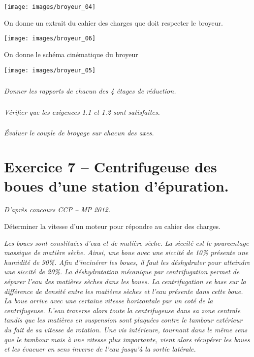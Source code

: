 \documentclass[10pt,fleqn]{article} %
\begin{document}
\begin{multicols}{2}
\begin{multicols}{2}
\begin{center}
\texttt{[image: images/broyeur\_04]}
\end{center}

On donne un extrait du cahier des charges que doit respecter le broyeur.


\begin{center}
\texttt{[image: images/broyeur\_06]}
\end{center}

On donne le schéma cinématique du broyeur
\begin{center}
\texttt{[image: images/broyeur\_05]}
\end{center}

\subparagraph{}\textit{Donner les rapports de chacun des 4 étages de réduction.}


\subparagraph{}\textit{Vérifier que les exigences 1.1 et 1.2 sont satisfaites.}

\subparagraph{}\textit{Évaluer le couple de broyage sur chacun des axes.}



\section*{Exercice 7 -- Centrifugeuse des boues d'une station d'épuration.}
\setcounter{exo}{0}
\textit{D'après concours CCP -- MP 2012.}

\begin{obj} Déterminer la vitesse d'un moteur pour répondre au cahier des charges. 
\end{obj}

\footnotesize{
\textit{Les boues sont constituées d’eau et de matière sèche. La siccité est le pourcentage massique de matière
sèche. Ainsi, une boue avec une siccité de 10\% présente une humidité de 90\%. Afin
d’incinérer les boues, il faut les déshydrater pour atteindre une siccité de 20\%. La déshydratation
mécanique par centrifugation permet de séparer l’eau des matières sèches dans les boues.
La centrifugation se base sur la différence de densité entre les matières sèches et l’eau présente dans
cette boue. La boue arrive avec une certaine vitesse horizontale par un coté de la centrifugeuse. L’eau 
traverse alors toute la centrifugeuse dans sa
zone centrale tandis que les matières en suspension sont plaquées contre le tambour extérieur du fait
de sa vitesse de rotation. Une vis intérieure, tournant dans le même sens que le tambour mais à une
vitesse plus importante, vient alors récupérer les boues et les évacuer en sens inverse de l’eau jusqu’à
la sortie latérale.}}



\end{multicols}
\end{multicols}
\end{document}

